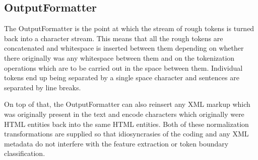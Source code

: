 \subsection{OutputFormatter}

The OutputFormatter is the point at which the stream of rough tokens
is turned back into a character stream. This means that all the rough
tokens are concatenated and whitespace is inserted between them
depending on whether there originally was any whitespace between them
and on the tokenization operations which are to be carried out in the
space between them. Individual tokens end up being separated by a
single space character and sentences are separated by line breaks.

On top of that, the OutputFormatter can also reinsert any XML markup
which was originally present in the text and encode characters which
originally were HTML entities back into the same HTML entities. Both
of these normalization transformations are supplied so that
idiosyncrasies of the coding and any XML metadata do not interfere
with the feature extraction or token boundary classification.

